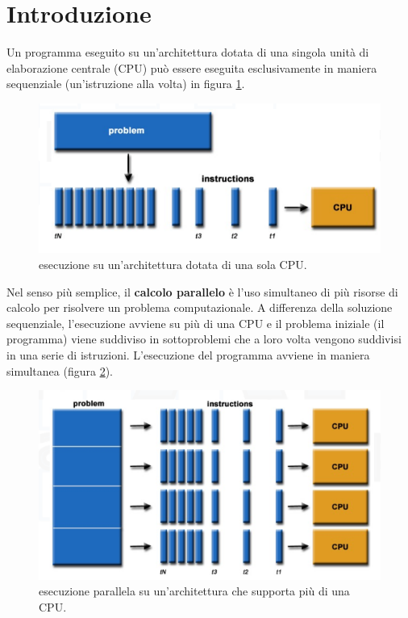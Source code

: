 \section{Introduzione}
Un programma eseguito su un'architettura dotata di una singola unità di elaborazione centrale (CPU) può essere eseguita esclusivamente in maniera sequenziale (un'istruzione alla volta) in figura \ref{fig:single-computation}.
\begin{figure}[th]
	\centering
	\includegraphics[width=0.7\linewidth]{img/single-computation}
	\caption{esecuzione su un'architettura dotata di una sola CPU.}
	\label{fig:single-computation}
\end{figure}
Nel senso più semplice, il \textbf{calcolo parallelo} è l'uso simultaneo di più risorse di calcolo per risolvere un problema computazionale. A differenza della soluzione sequenziale, l'esecuzione avviene su più di una CPU e il problema iniziale (il programma) viene suddiviso in sottoproblemi che a loro volta vengono suddivisi in una serie di istruzioni. L'esecuzione del programma avviene in maniera simultanea (figura \ref{fig:parallel-computation}).
\begin{figure}[th]
	\centering
	\includegraphics[width=0.7\linewidth]{img/parallel-computation}
	\caption{esecuzione parallela su un'architettura che supporta più di una CPU.}
	\label{fig:parallel-computation}
\end{figure}
